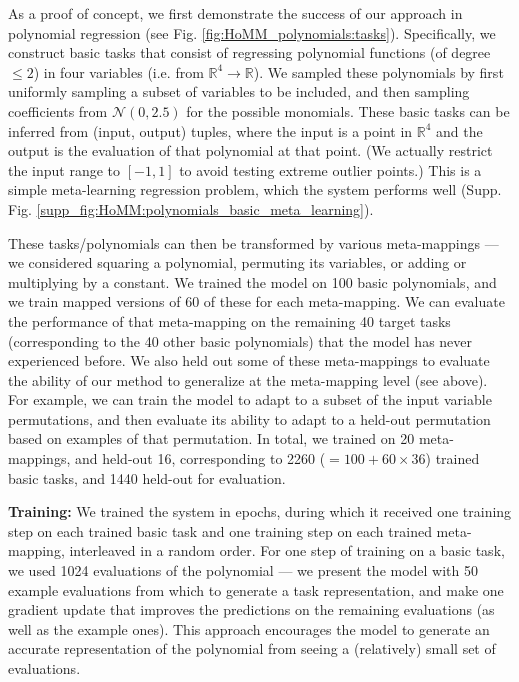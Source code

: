 As a proof of concept, we first demonstrate the success of our approach in polynomial regression (see Fig. \ref{fig:HoMM_polynomials:tasks}). Specifically, we construct basic tasks that consist of regressing polynomial functions (of degree \(\leq 2\)) in four variables (i.e. from \(\mathbb{R}^4 \rightarrow \mathbb{R}\)). We sampled these polynomials by first uniformly sampling a subset of variables to be included, and then sampling coefficients from \(\mathcal{N}(0, 2.5)\) for the possible monomials. These basic tasks can be inferred from (input, output) tuples, where the input is a point in \(\mathbb{R}^4\) and the output is the evaluation of that polynomial at that point. (We actually restrict the input range to \([-1, 1]\) to avoid testing extreme outlier points.) This is a simple meta-learning regression problem, which the system performs well (Supp. Fig. \ref{supp_fig:HoMM:polynomials_basic_meta_learning}). 

These tasks/polynomials can then be transformed by various meta-mappings --- we considered squaring a polynomial, permuting its variables, or adding or multiplying by a constant. We trained the model on 100 basic polynomials, and we train mapped versions of 60 of these for each meta-mapping. We can evaluate the performance of that meta-mapping on the remaining 40 target tasks (corresponding to the 40 other basic polynomials) that the model has never experienced before. We also held out some of these meta-mappings to evaluate the ability of our method to generalize at the meta-mapping level (see above). For example, we can train the model to adapt to a subset of the input variable permutations, and then evaluate its ability to adapt to a held-out permutation based on examples of that permutation. In total, we trained on 20 meta-mappings, and held-out 16, corresponding to 2260 (\(=100 + 60 \times 36 \)) trained basic tasks, and 1440 held-out for evaluation. 

\textbf{Training:} We trained the system in epochs, during which it received one training step on each trained basic task and one training step on each trained meta-mapping, interleaved in a random order. For one step of training on a basic task, we used 1024 evaluations of the polynomial --- we present the model with 50 example evaluations from which to generate a task representation, and make one gradient update that improves the predictions on the remaining evaluations (as well as the example ones). This approach encourages the model to generate an accurate representation of the polynomial from seeing a (relatively) small set of evaluations. 

